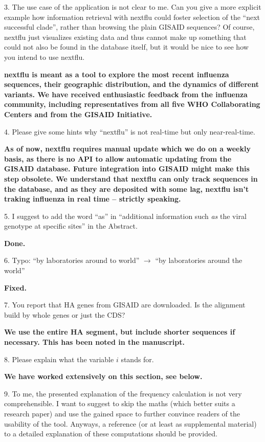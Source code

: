 \documentclass[11pt,oneside,letterpaper]{article}
\begin{document}
3. The use case of the application is not clear to me. Can you give a more explicit example how information retrieval with nextflu could foster selection of the ``next successful clade'', rather than browsing the plain GISAID sequences? Of course, nextflu just visualizes existing data and thus cannot make up something that could not also be found in the database itself, but it would be nice to see how you intend to use nextflu.

{\bf nextflu is meant as a tool to explore the most recent influenza sequences, their geographic distribution, and the dynamics of different variants. We have received enthusiastic feedback from the influenza community, including representatives from all five WHO Collaborating Centers and from the GISAID Initiative.}

4. Please give some hints why ``nextflu'' is not real-time but only near-real-time.

{\bf As of now, nextflu requires manual update which we do on a weekly basis, as there is no API to allow automatic updating from the GISAID database. Future integration into GISAID might make this step obsolete. We understand that nextflu can only track sequences in the database, and as they are deposited with some lag, nextflu isn't traking influenza in real time -- strictly speaking.}

5. I suggest to add the word ``as'' in ``additional information such \textit{as} the viral genotype at specific sites'' in the Abstract.

\textbf{Done.}

6. Typo: ``by laboratories around to world'' $\rightarrow$ ``by laboratories around the world''

\textbf{Fixed.}

7. You report that HA genes from GISAID are downloaded. Is the alignment build by whole genes or just the CDS?

{\bf We use the entire HA segment, but include shorter sequences if necessary. This has been noted in the manuscript.}

8. Please explain what the variable $i$ stands for.

{\bf We have worked extensively on this section, see below.}

9. To me, the presented explanation of the frequency calculation is not very comprehensible. I want to suggest to skip the maths (which better suits a research paper) and use the gained space to further convince readers of the usability of the tool. Anyways, a reference (or at least as supplemental material) to a detailed explanation of these computations should be provided.
\end{document}

